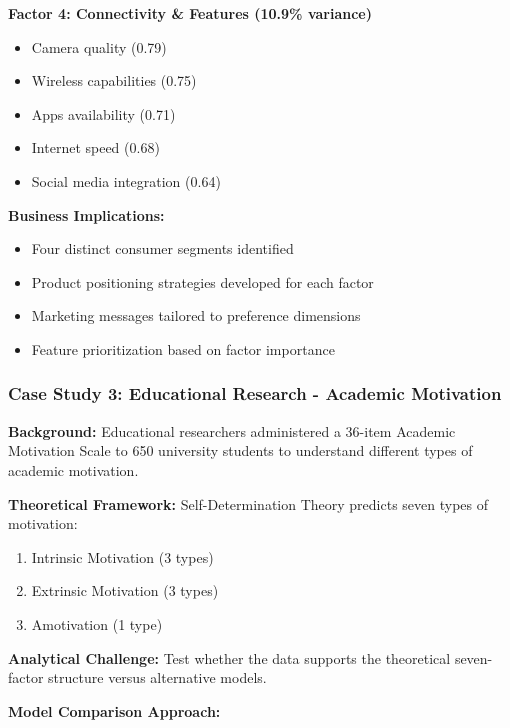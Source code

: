 \documentclass[
]{article}
\begin{document}
\textbf{Factor 4: Connectivity \& Features (10.9\% variance)}

\begin{itemize}
\item
  Camera quality (0.79)
\item
  Wireless capabilities (0.75)
\item
  Apps availability (0.71)
\item
  Internet speed (0.68)
\item
  Social media integration (0.64)
\end{itemize}

\textbf{Business Implications:}

\begin{itemize}
\item
  Four distinct consumer segments identified
\item
  Product positioning strategies developed for each factor
\item
  Marketing messages tailored to preference dimensions
\item
  Feature prioritization based on factor importance
\end{itemize}

\subsubsection{Case Study 3: Educational Research - Academic Motivation}

\textbf{Background:} Educational researchers administered a 36-item
Academic Motivation Scale to 650 university students to understand
different types of academic motivation.

\textbf{Theoretical Framework:} Self-Determination Theory predicts seven
types of motivation:

\begin{enumerate}
\item
  Intrinsic Motivation (3 types)
\item
  Extrinsic Motivation (3 types)
\end{enumerate}

\begin{enumerate}
\setcounter{enumi}{2}
\item
  Amotivation (1 type)
\end{enumerate}

\textbf{Analytical Challenge:} Test whether the data supports the
theoretical seven-factor structure versus alternative models.

\textbf{Model Comparison Approach:}
\end{document}

